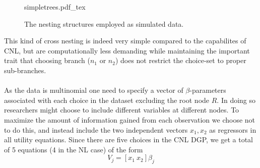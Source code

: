 \begin{figure}[!h]
  \begin{center}
  \def\svgwidth{0.90\columnwidth}
  {simpletrees.pdf_tex}
  \end{center}
  \caption{The nesting structures employed as simulated data.}
  \label{fig: simpletree}
\end{figure}

This kind of cross nesting is indeed very simple compared to the capabilites of CNL, but are computationally less demanding while maintaining the important trait that choosing branch ($n_1$ or $n_2$) does not restrict the choice-set to proper sub-branches.
\\ \\
As the data is multinomial one need to specify a vector of $\beta$-parameters associated with each choice in the dataset excluding the root node $R$. In doing so researchers might choose to include different variables at different nodes. To maximize the amount of information gained from each observation we choose not to do this, and instead include the two independent vectors $x_1, x_2$ as regressors in all utility equations. Since there are five choices in the CNL DGP, we get a total of 5 equations (4 in the NL case) of the form
\begin{equation}
V_j = [x_1 \ x_2] \beta_j
\end{equation}

